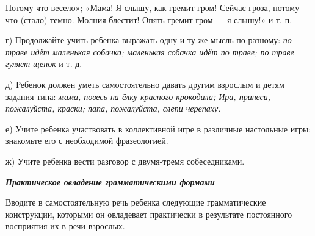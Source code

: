 \documentclass[a5paper]{book}
\renewcommand{\emph}[1]{\textit{#1}}
\begin{document}
Потому что весело»; «Мама! Я слышу, как гремит гром! Сейчас гроза,
потому что (стало) темно. Молния блестит! Опять гремит гром --- я
слышу!» и т. п.

г) Продолжайте учить ребенка выражать одну и ту же мысль по-разному:
\emph{по траве идёт маленькая собачка; маленькая собачка идёт по траве;
по траве гуляет щенок} и т. д.

д) Ребенок должен уметь самостоятельно давать другим взрослым и детям
задания типа: \emph{мама, повесь на ёлку красного крокодила; Ира,
принеси, пожалуйста, краски; папа, пожалуйста, слепи черепаху.}

е) Учите ребенка участвовать в коллективной игре в различные настольные
игры; знакомьте его с необходимой фразеологией.

ж) Учите ребенка вести разговор с двумя-тремя собеседниками.

\emph{\textbf{Практическое овладение грамматическими формами}}

Вводите в самостоятельную речь ребенка следующие грамматические
конструкции, которыми он овладевает практически в результате постоянного
восприятия их в речи взрослых.
\end{document}
